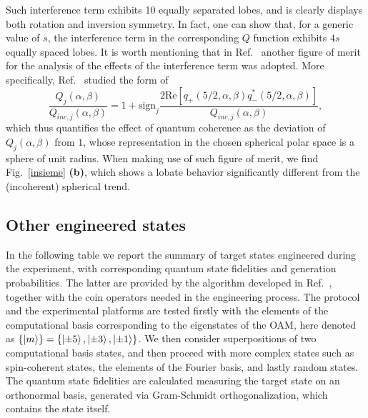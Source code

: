 Such interference term exhibits 10 equally separated lobes, and is clearly displays both rotation and inversion symmetry. In fact, one can show that, for a generic value of $s$, the interference term in the corresponding $Q$ function exhibits $4s$ equally spaced lobes. It is worth mentioning that in Ref.~\cite{agarwal1997atomic} another figure of merit for the analysis of the effects of the interference term was adopted. More specifically, Ref.~\cite{agarwal1997atomic} studied the form of 
\begin{equation}
\frac{Q_j(\alpha,\beta)}{Q_{inc,j}(\alpha,\beta)}=1+\text{sign}_j\frac{2\text{Re}[q_+(5/2,\alpha,\beta)q^*_-(5/2,\alpha,\beta)]}{Q_{inc,j}(\alpha,\beta)},
\end{equation}
which thus quantifies the effect of quantum coherence as the deviation of $Q_j(\alpha,\beta)$ from $1$, whose representation in the chosen spherical polar space is a sphere of unit radius. When making use of such figure of merit, we find Fig.~\ref{insieme} {\bf (b)}, which shows a lobate behavior significantly different from the (incoherent) spherical trend. 


\subsection{Other engineered states}

In the following table we report the summary of target states engineered during the experiment, with corresponding quantum state fidelities and generation probabilities. The latter are provided by the algorithm developed in Ref.~\cite{innocenti2017quantum}, together with the coin operators needed in the engineering process.
The protocol and the experimental platforms are tested firstly with the elements of the computational basis corresponding to the eigenstates of the \ac{OAM}, here denoted as $\{\ket{m} \}=\{\ket{\pm5}, \ket{\pm3},\ket{\pm1} \}$. We then consider superpositions of two computational basis states, and then proceed with more complex states such as spin-coherent states, the elements of the Fourier basis, and lastly random states. The quantum state fidelities are calculated measuring the target state on an orthonormal basis, generated via Gram-Schmidt orthogonalization, which contains the state itself.

